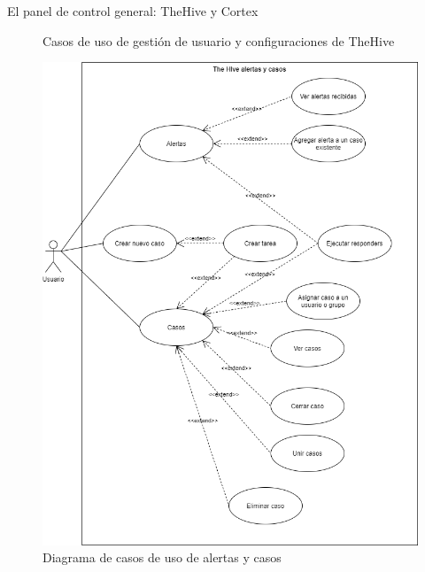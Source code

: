 \begin{subsection}{El panel de control general: TheHive y Cortex}
\begin{figure}[H]
        \caption{Casos de uso de gestión de usuario y configuraciones de TheHive}
        \label{fig:caso_de_uso_gestion_usuario_conf_thehive}
     \end{figure}
     \begin{figure}[H]
        \centering
        \includegraphics[width=1\textwidth]{./iteracion_1_imagenes/figura_29_thehive_alertas_casos.png}
        \caption{Diagrama de casos de uso de alertas y casos}
        \label{fig:caso_de_uso_alertas_casos}
     \end{figure}
     \begin{figure}[H]
        \centering

\end{figure}
\end{subsection}
